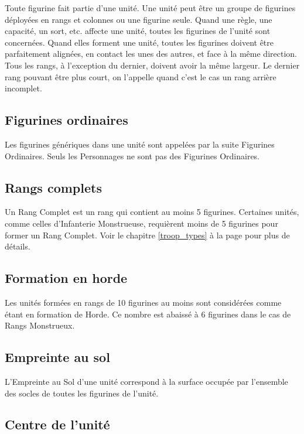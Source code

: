Toute figurine fait partie d'une unité. Une unité peut être un groupe de figurines déployées en rangs et colonnes ou une figurine seule. Quand une règle, une capacité, un sort, etc. affecte une unité, toutes les figurines de l'unité sont concernées. Quand elles forment une unité, toutes les figurines doivent être parfaitement alignées, en contact les unes des autres, et face à la même direction. Tous les rangs, à l'exception du dernier, doivent avoir la même largeur. Le dernier rang pouvant être plus court, on l'appelle quand c'est le cas un rang arrière incomplet. 

\subsection{Figurines ordinaires}

Les figurines génériques dans une unité sont appelées par la suite Figurines Ordinaires. Seuls les Personnages ne sont pas des Figurines Ordinaires.

\subsection{Rangs complets}

Un Rang Complet est un rang qui contient au moins 5 figurines. Certaines unités, comme celles d'Infanterie Monstrueuse, requièrent moins de 5 figurines pour former un Rang Complet. Voir le chapitre \ref{troop_types} à la page \pageref{troop_types} pour plus de détails.

\subsection{Formation en horde}
\label{horde}

Les unités formées en rangs de 10 figurines au moins sont considérées comme étant en formation de Horde. Ce nombre est abaissé à 6 figurines dans le cas de Rangs Monstrueux.

\subsection{Empreinte au sol}

L'Empreinte au Sol d'une unité correspond à la surface occupée par l'ensemble des socles de toutes les figurines de l'unité.

\subsection{Centre de l'unité}
\label{centre_unite}

